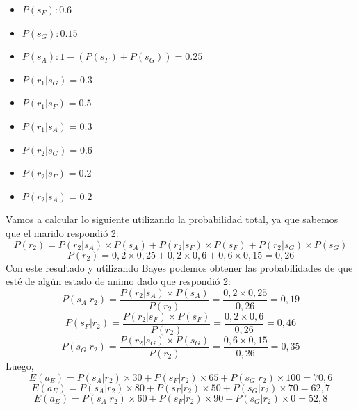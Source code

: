 \documentclass[11pt,letterpaper]{article}
\begin{document}
\begin{itemize}
    \item $P(s_F): 0.6$
    \item $P(s_G): 0.15$
    \item $P(s_A): 1 - (P(s_F) + P(s_G)) = 0.25$
    \item $P(r_1|s_G) = 0.3$
    \item $P(r_1|s_F) = 0.5$
    \item $P(r_1|s_A) = 0.3$
    \item $P(r_2|s_G) = 0.6$
    \item $P(r_2|s_F) = 0.2$
    \item $P(r_2|s_A) = 0.2$
\end{itemize}
Vamos a calcular lo siguiente utilizando la probabilidad total, ya que sabemos que el marido respondió 2:
\begin{equation*}
    P(r_2) = P(r_2|s_A)\times P(s_A) + P(r_2|s_F)\times P(s_F) + P(r_2|s_G)\times P(s_G)
\end{equation*}
\begin{equation*}
    P(r_2) = 0,2\times 0,25 + 0,2\times 0,6 + 0,6\times 0,15 = 0,26
\end{equation*}
Con este resultado y utilizando Bayes podemos obtener las probabilidades de que esté de algún estado de animo dado que respondió 2:
\begin{equation*}
        P(s_A|r_2) = \frac{P(r_2|s_A)\times P(s_A)}{P(r_2)} = \frac{0,2\times 0,25}{0,26} = 0,19
\end{equation*}
\begin{equation*}
        P(s_F|r_2) = \frac{P(r_2|s_F)\times P(s_F)}{P(r_2)} = \frac{0,2\times 0,6}{0,26} = 0,46
\end{equation*}
\begin{equation*}
        P(s_G|r_2) = \frac{P(r_2|s_G)\times P(s_G)}{P(r_2)} = \frac{0,6\times 0,15}{0,26} = 0,35
\end{equation*}
Luego, 
\begin{equation*}
    E(a_E) = P(s_A|r_2) \times 30 + P(s_F|r_2) \times 65 + P(s_G|r_2) \times 100 = 70,6
\end{equation*}
\begin{equation*}
    E(a_E) = P(s_A|r_2) \times 80 + P(s_F|r_2) \times 50 + P(s_G|r_2) \times 70 = 62,7
\end{equation*}
\begin{equation*}
    E(a_E) = P(s_A|r_2) \times 60 + P(s_F|r_2) \times 90 + P(s_G|r_2) \times 0 = 52,8
\end{equation*}
\end{document}

